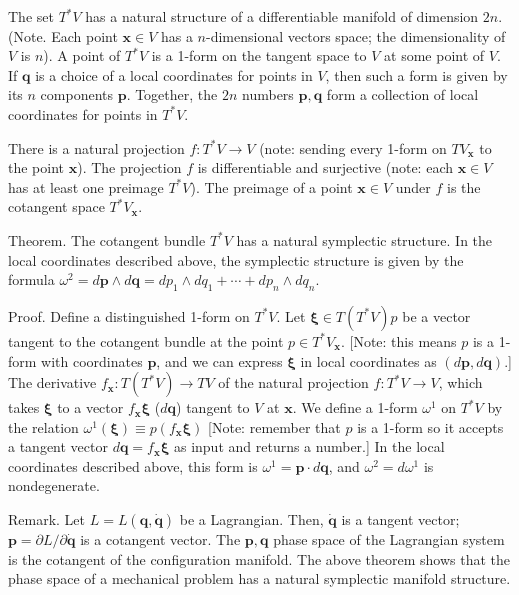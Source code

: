 \documentclass{book}
\begin{document}
The set $T^*V$ has a natural structure of a differentiable manifold of
dimension $2 n$.
(Note. Each point $\mathbf x \in V$ has a $n$-dimensional vectors space;
the dimensionality of $V$ is $n$).
%
A point of $T^*V$ is a 1-form on the tangent space to $V$ at some point of $V$.
%
If $\mathbf q$ is a choice of a local coordinates for points in $V$,
then such a form is given by its $n$ components $\mathbf p$.
%
Together, the $2n$ numbers $\mathbf p, \mathbf q$ form a collection of local coordinates
for points in $T^*V$.


There is a natural projection
$f: T^*V \rightarrow V$
(note: sending every 1-form on $TV_{\mathbf x}$
to the point $\mathbf x$).
%
The projection $f$ is differentiable and surjective
(note: each $\mathbf x \in V$ has at least one preimage $T^*V$).
%
The preimage of a point $\mathbf x \in V$ under $f$
is the cotangent space $T^*V_{\mathbf x}$.


Theorem.
The cotangent bundle $T^*V$ has a natural symplectic structure.
%
In the local coordinates described above,
the symplectic structure is given by the formula
$\omega^2 = d\mathbf p \wedge d\mathbf q = dp_1 \wedge dq_1 + \cdots + dp_n \wedge dq_n$.

Proof.
Define a distinguished 1-form on $T^*V$.
%
Let $\pmb \xi \in T(T^*V)p$ be a vector tangent to the cotangent bundle at
the point $p \in T^*V_{\mathbf x}$.
[Note: this means $p$ is a 1-form with coordinates $\mathbf p$,
and we can express $\pmb \xi$ in local coordinates as $(d\mathbf p, d\mathbf q)$.]
%
The derivative $f_{\mathbf x}: T(T^*V) \rightarrow TV$
of the natural projection $f: T^*V \rightarrow V$,
which takes $\pmb \xi$ to a vector $f_{\mathbf x} \pmb \xi$ ($d\mathbf q$)
tangent to $V$ at $\mathbf x$.
%
We define a 1-form $\omega^1$ on $T^*V$ by the relation
$\omega^1(\pmb \xi) \equiv p( f_{\mathbf x}\pmb \xi )$
[Note: remember that $p$ is a 1-form so it accepts
  a tangent vector $d\mathbf q = f_{\mathbf x} \pmb \xi$
as input and returns a number.]
%
In the local coordinates described above,
this form is
$\omega^1 = \mathbf p \cdot d\mathbf q$,
and
$\omega^2 = d\omega^1$ is nondegenerate.


Remark.
Let $L = L(\mathbf q, \dot{\mathbf q})$  be a Lagrangian.
%
Then, $\dot{\mathbf q}$ is a tangent vector;
%
$\mathbf p = \partial L/\partial \dot{\mathbf q}$
is a cotangent vector.
%
The $\mathbf p, \mathbf q$ phase space of the Lagrangian system
is the cotangent of the configuration manifold.
%
The above theorem shows that the phase space of
a mechanical problem has a natural symplectic
manifold structure.
\end{document}
